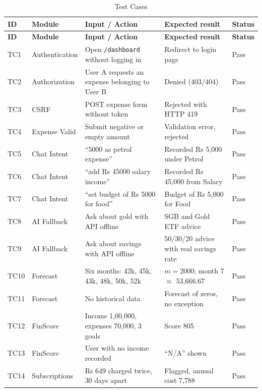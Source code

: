 \documentclass[12pt,a4paper]{report}
\begin{document}
\begingroup
\singlespacing
\footnotesize
\setlength{\tabcolsep}{4pt}
\renewcommand{\arraystretch}{1.15}
\setlength{\parskip}{0pt}
\begin{longtable}{|p{0.9cm}|p{2.4cm}|p{4.2cm}|p{4.3cm}|p{1.5cm}|}
\caption{Test Cases}\label{tab:tests}\\
\hline \textbf{ID} & \textbf{Module} & \textbf{Input / Action} & \textbf{Expected result} & \textbf{Status} \\ \hline
\endfirsthead
\hline \textbf{ID} & \textbf{Module} & \textbf{Input / Action} & \textbf{Expected result} & \textbf{Status} \\ \hline
\endhead
TC1 & Authentication & Open \texttt{/dashboard} without logging in & Redirect to login page & Pass \\ \hline
TC2 & Authorization & User A requests an expense belonging to User B & Denied (403/404) & Pass \\ \hline
TC3 & CSRF & POST expense form without token & Rejected with HTTP 419 & Pass \\ \hline
TC4 & Expense Valid & Submit negative or empty amount & Validation error, rejected & Pass \\ \hline
TC5 & Chat Intent & ``5000 as petrol expense'' & Recorded Rs 5,000 under Petrol & Pass \\ \hline
TC6 & Chat Intent & ``add Rs 45000 salary income'' & Recorded Rs 45,000 from Salary & Pass \\ \hline
TC7 & Chat Intent & ``set budget of Rs 5000 for food'' & Budget of Rs 5,000 for Food & Pass \\ \hline
TC8 & AI Fallback & Ask about gold with API offline & SGB and Gold ETF advice & Pass \\ \hline
TC9 & AI Fallback & Ask about savings with API offline & 50/30/20 advice with real savings rate & Pass \\ \hline
TC10 & Forecast & Six months: 42k, 45k, 43k, 48k, 50k, 52k & $m = 2000$; month 7 $\approx$ 53,666.67 & Pass \\ \hline
TC11 & Forecast & No historical data & Forecast of zeros, no exception & Pass \\ \hline
TC12 & FinScore & Income 1,00,000, expenses 70,000, 3 goals & Score 805 & Pass \\ \hline
TC13 & FinScore & User with no income recorded & ``N/A'' shown & Pass \\ \hline
TC14 & Subscriptions & Rs 649 charged twice, 30 days apart & Flagged, annual cost 7,788 & Pass \\ \hline

\end{longtable}
\end{document}
